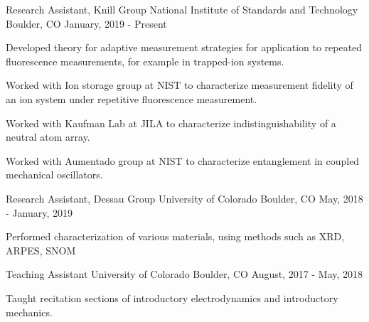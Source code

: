 

\begin{cventries}

  \cventry
    {Research Assistant, Knill Group} %
    {National Institute of Standards and Technology} %
    {Boulder, CO} %
    {January, 2019 - Present} %
    {
      \begin{cvitems} %
        \item {Developed theory for adaptive measurement strategies for
          application to repeated fluorescence measurements, for example in trapped-ion systems.}
        \item {Worked with Ion storage group at NIST to characterize
          measurement fidelity of an ion system under repetitive fluorescence
        measurement.}
        \item {Worked with Kaufman Lab at JILA to characterize
          indistinguishability of a neutral atom array.}
        \item {Worked with Aumentado group at NIST to characterize entanglement
          in coupled mechanical oscillators.}
      \end{cvitems}
    }

  \cventry
    {Research Assistant, Dessau Group} %
    {University of Colorado} %
    {Boulder, CO} %
    {May, 2018 - January, 2019} %
    {
      \begin{cvitems} %
        \item {Performed characterization of various
          materials, using methods such as XRD, ARPES, SNOM}
      \end{cvitems}
    }

  \cventry
    {Teaching Assistant} %
    {University of Colorado} %
    {Boulder, CO} %
    {August, 2017 - May, 2018} %
    {
      \begin{cvitems} %
        \item {Taught recitation sections of introductory electrodynamics and
          introductory mechanics.}
      \end{cvitems}
    }


\end{cventries}
